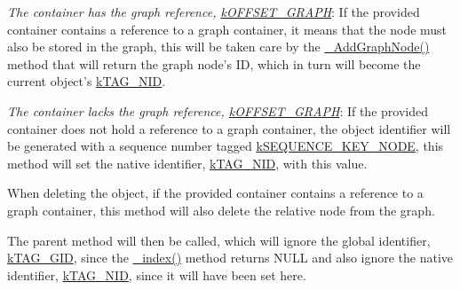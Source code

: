 \begin{DoxyItemize}
\item {\itshape The container has the graph reference, \hyperlink{}{k\-O\-F\-F\-S\-E\-T\-\_\-\-G\-R\-A\-P\-H}}\-: If the provided container contains a reference to a graph container, it means that the node must also be stored in the graph, this will be taken care by the \hyperlink{class_c_ontology_node_aa91367053433a0bdd052650f9eb54a7c}{\-\_\-\-Add\-Graph\-Node()} method that will return the graph node's I\-D, which in turn will become the current object's \hyperlink{}{k\-T\-A\-G\-\_\-\-N\-I\-D}. 
\item {\itshape The container lacks the graph reference, \hyperlink{}{k\-O\-F\-F\-S\-E\-T\-\_\-\-G\-R\-A\-P\-H}}\-: If the provided container does not hold a reference to a graph container, the object identifier will be generated with a sequence number tagged \hyperlink{}{k\-S\-E\-Q\-U\-E\-N\-C\-E\-\_\-\-K\-E\-Y\-\_\-\-N\-O\-D\-E}, this method will set the native identifier, \hyperlink{}{k\-T\-A\-G\-\_\-\-N\-I\-D}, with this value. 
\end{DoxyItemize}

When deleting the object, if the provided container contains a reference to a graph container, this method will also delete the relative node from the graph.

The parent method will then be called, which will ignore the global identifier, \hyperlink{}{k\-T\-A\-G\-\_\-\-G\-I\-D}, since the \hyperlink{class_c_persistent_object_a34a9e2d5a39a5b8fb3ce00cf77c6a9d6}{\-\_\-index()} method returns {\ttfamily N\-U\-L\-L} and also ignore the native identifier, \hyperlink{}{k\-T\-A\-G\-\_\-\-N\-I\-D}, since it will have been set here.


